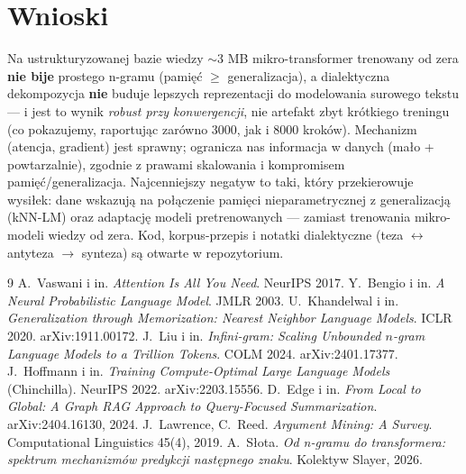 \documentclass[11pt]{article}
\begin{document}
\section{Wnioski}
Na ustrukturyzowanej bazie wiedzy $\sim$3 MB mikro-transformer trenowany od zera \textbf{nie bije} prostego n-gramu
(pamięć $\geq$ generalizacja), a dialektyczna dekompozycja \textbf{nie} buduje lepszych reprezentacji do
modelowania surowego tekstu --- i jest to wynik \emph{robust przy konwergencji}, nie artefakt zbyt krótkiego
treningu (co pokazujemy, raportując zarówno 3000, jak i 8000 kroków). Mechanizm (atencja, gradient) jest sprawny;
ogranicza nas informacja w danych (mało + powtarzalnie), zgodnie z prawami skalowania i kompromisem
pamięć/generalizacja. Najcenniejszy negatyw to taki, który przekierowuje wysiłek: dane wskazują na połączenie
pamięci nieparametrycznej z generalizacją (kNN-LM) oraz adaptację modeli pretrenowanych --- zamiast trenowania
mikro-modeli wiedzy od zera. Kod, korpus-przepis i notatki dialektyczne (teza $\leftrightarrow$ antyteza $\to$
synteza) są otwarte w repozytorium.

\begin{thebibliography}{9}
 A.~Vaswani i in. \emph{Attention Is All You Need}. NeurIPS 2017.
 Y.~Bengio i in. \emph{A Neural Probabilistic Language Model}. JMLR 2003.
 U.~Khandelwal i in. \emph{Generalization through Memorization: Nearest Neighbor Language Models}. ICLR 2020. arXiv:1911.00172.
 J.~Liu i in. \emph{Infini-gram: Scaling Unbounded $n$-gram Language Models to a Trillion Tokens}. COLM 2024. arXiv:2401.17377.
 J.~Hoffmann i in. \emph{Training Compute-Optimal Large Language Models} (Chinchilla). NeurIPS 2022. arXiv:2203.15556.
 D.~Edge i in. \emph{From Local to Global: A Graph RAG Approach to Query-Focused Summarization}. arXiv:2404.16130, 2024.
 J.~Lawrence, C.~Reed. \emph{Argument Mining: A Survey}. Computational Linguistics 45(4), 2019.
 A.~Słota. \emph{Od n-gramu do transformera: spektrum mechanizmów predykcji następnego znaku}. Kolektyw Slayer, 2026.
\end{thebibliography}
\end{document}
